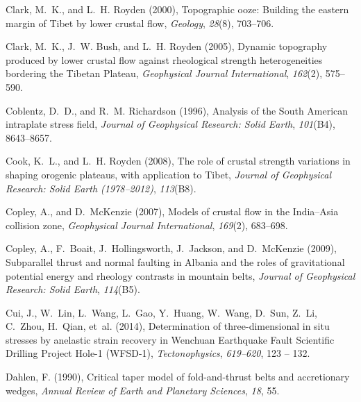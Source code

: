 \documentclass[draft,jgrga]{AGUTeX}
\begin{document}
\begin{article}
\begin{thebibliography}{90}
Clark, M.~K., and L.~H. Royden (2000), Topographic ooze: {B}uilding the eastern
  margin of {T}ibet by lower crustal flow, \textit{Geology}, \textit{28}(8),
  703--706.

Clark, M.~K., J.~W. Bush, and L.~H. Royden (2005), Dynamic topography produced
  by lower crustal flow against rheological strength heterogeneities bordering
  the {T}ibetan {P}lateau, \textit{Geophysical Journal International},
  \textit{162}(2), 575--590.

Coblentz, D.~D., and R.~M. Richardson (1996), Analysis of the {S}outh
  {A}merican intraplate stress field, \textit{Journal of Geophysical Research:
  Solid Earth}, \textit{101}(B4), 8643--8657.

Cook, K.~L., and L.~H. Royden (2008), The role of crustal strength variations
  in shaping orogenic plateaus, with application to {T}ibet, \textit{Journal of
  Geophysical Research: Solid Earth (1978--2012)}, \textit{113}(B8).

Copley, A., and D.~McKenzie (2007), Models of crustal flow in the
  {I}ndia--{A}sia collision zone, \textit{Geophysical Journal International},
  \textit{169}(2), 683--698.

Copley, A., F.~Boait, J.~Hollingsworth, J.~Jackson, and D.~McKenzie (2009),
  Subparallel thrust and normal faulting in {A}lbania and the roles of
  gravitational potential energy and rheology contrasts in mountain belts,
  \textit{Journal of Geophysical Research: Solid Earth}, \textit{114}(B5).

Cui, J., W.~Lin, L.~Wang, L.~Gao, Y.~Huang, W.~Wang, D.~Sun, Z.~Li, C.~Zhou,
  H.~Qian, et~al. (2014), Determination of three-dimensional in situ stresses
  by anelastic strain recovery in {W}enchuan {E}arthquake {F}ault {S}cientific
  {D}rilling {P}roject {H}ole-1 ({W}{F}{S}{D}-1), \textit{Tectonophysics},
  \textit{619–620}, 123 -- 132.

Dahlen, F. (1990), Critical taper model of fold-and-thrust belts and
  accretionary wedges, \textit{Annual Review of Earth and Planetary Sciences},
  \textit{18}, 55.


\end{thebibliography}
\end{article}
\end{document}
